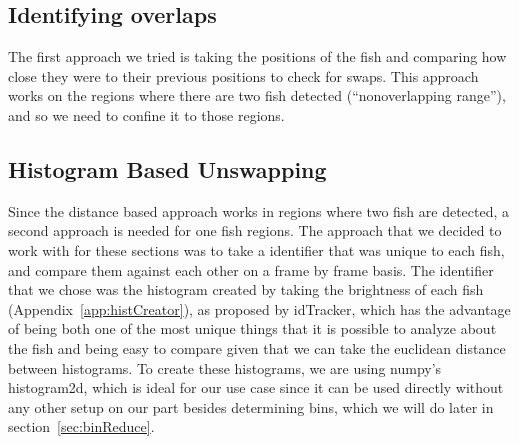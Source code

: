 \documentclass{article}
\newcommand{\yf}[1]{{\color{darkRed}{#1}}}
\begin{document}


\subsection{Identifying overlaps}


\yf{[YF] Stopping here for now.}

\yf{After this I would first discuss the principle of the histogram method in a frame-to-frame context. Then, possibly in a separate methods subsection, discuss locating the overlaps and averaging the histograms over nonoverlapping ranges for a more accurate/less noisy comparison.}

\clearpage
\vspace{1in}


The first approach we tried is taking the positions of the fish and comparing how close they were to their previous positions to check for swaps. This approach works on the regions where there are two fish detected (``nonoverlapping range''), and so we need to confine it to those regions. 

\subsection{Histogram Based Unswapping}

Since the distance based approach works in regions where two fish are detected, a second approach is needed for one fish regions. The approach that we decided to work with for these sections was to take a identifier that was unique to each fish, and compare them against each other on a frame by frame basis. The identifier that we chose was the histogram created by taking the brightness of each fish (Appendix~\ref{app:histCreator}), as proposed by idTracker\cite{perez-escudero_idtracker_2014}, which has the advantage of being both one of the most unique things that it is possible to analyze about the fish and being easy to compare given that we can take the euclidean distance between histograms. To create these histograms, we are using numpy's histogram2d, which is ideal for our use case since it can be used directly without any other setup on our part besides determining bins, which we will do later in section~\ref{sec:binReduce}.
\end{document}
